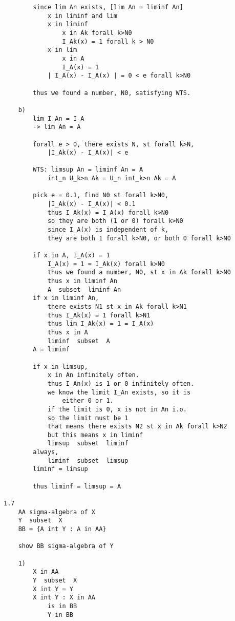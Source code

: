 \documentclass{article}
\begin{document}
\begin{flushleft}
\begin{verbatim}
        since lim An exists, [lim An = liminf An]
            x in liminf and lim 
            x in liminf
                x in Ak forall k>N0 
                I_Ak(x) = 1 forall k > N0 
            x in lim
                x in A 
                I_A(x) = 1 
            | I_A(x) - I_A(x) | = 0 < e forall k>N0 

        thus we found a number, N0, satisfying WTS.

    b)
        lim I_An = I_A 
        -> lim An = A 

        forall e > 0, there exists N, st forall k>N, 
            |I_Ak(x) - I_A(x)| < e 

        WTS: limsup An = liminf An = A 
            int_n U_k>n Ak = U_n int_k>n Ak = A 

        pick e = 0.1, find N0 st forall k>N0, 
            |I_Ak(x) - I_A(x)| < 0.1 
            thus I_Ak(x) = I_A(x) forall k>N0 
            so they are both (1 or 0) forall k>N0
            since I_A(x) is independent of k, 
            they are both 1 forall k>N0, or both 0 forall k>N0 

        if x in A, I_A(x) = 1 
            I_A(x) = 1 = I_Ak(x) forall k>N0 
            thus we found a number, N0, st x in Ak forall k>N0 
            thus x in liminf An 
            A  subset  liminf An 
        if x in liminf An, 
            there exists N1 st x in Ak forall k>N1 
            thus I_Ak(x) = 1 forall k>N1 
            thus lim I_Ak(x) = 1 = I_A(x)
            thus x in A
            liminf  subset  A  
        A = liminf     

        if x in limsup, 
            x in An infinitely often. 
            thus I_An(x) is 1 or 0 infinitely often. 
            we know the limit I_An exists, so it is 
                either 0 or 1. 
            if the limit is 0, x is not in An i.o. 
            so the limit must be 1 
            that means there exists N2 st x in Ak forall k>N2 
            but this means x in liminf 
            limsup  subset  liminf 
        always,
            liminf  subset  limsup 
        liminf = limsup 

        thus liminf = limsup = A

1.7
    AA sigma-algebra of X 
    Y  subset  X 
    BB = {A int Y : A in AA}

    show BB sigma-algebra of Y

    1) 
        X in AA 
        Y  subset  X
        X int Y = Y
        X int Y : X in AA
            is in BB 
            Y in BB 


\end{verbatim}
\end{flushleft}
\end{document}
